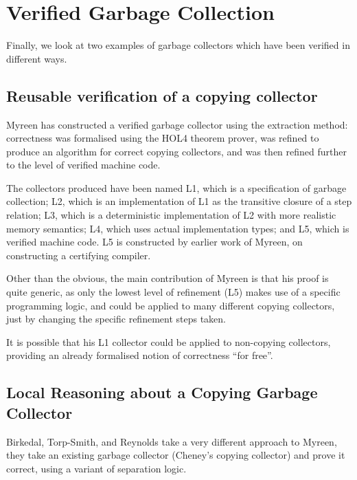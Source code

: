 
\section{Verified Garbage Collection}

Finally, we look at two examples of garbage collectors which have been
verified in different ways.

\subsection{Reusable verification of a copying collector}

Myreen\cite{Myreen10} has constructed a verified garbage collector
using the extraction method: correctness was formalised using the HOL4
theorem prover, was refined to produce an algorithm for correct
copying collectors, and was then refined further to the level of
verified machine code.

The collectors produced have been named L1, which is a specification
of garbage collection; L2, which is an implementation of L1 as the
transitive closure of a step relation; L3, which is a deterministic
implementation of L2 with more realistic memory semantics; L4, which
uses actual implementation types; and L5, which is verified machine
code. L5 is constructed by earlier work of Myreen, on constructing a
certifying compiler.

Other than the obvious, the main contribution of Myreen is that his
proof is quite generic, as only the lowest level of refinement (L5)
makes use of a specific programming logic, and could be applied to many
different copying collectors, just by changing the specific refinement
steps taken.

It is possible that his L1 collector could be applied to non-copying
collectors, providing an already formalised notion of correctness
``for free''.

\subsection{Local Reasoning about a Copying Garbage Collector}

Birkedal, Torp-Smith, and Reynolds\cite{Birkedal04} take a very
different approach to Myreen, they take an existing garbage collector
(Cheney's copying collector) and prove it correct, using a variant of
separation logic.

